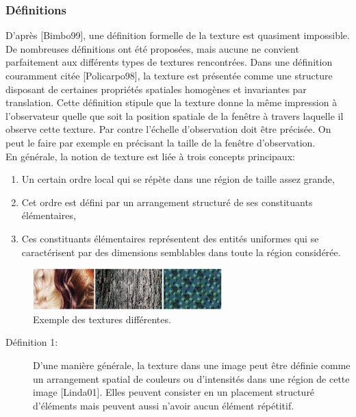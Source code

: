 \subsubsection{Définitions}

D'après [Bimbo99], une définition formelle de la texture est quasiment impossible. De nombreuses définitions ont été proposées, mais aucune ne convient parfaitement aux différents types de textures rencontrées. Dans une définition couramment citée [Policarpo98], la texture est présentée comme une structure disposant de certaines propriétés spatiales homogènes et invariantes par translation. Cette définition stipule que la texture donne la même impression à l'observateur quelle que soit la position spatiale de la fenêtre à travers laquelle il observe cette texture. Par contre l'échelle d’observation doit être précisée. On peut le faire par exemple en précisant la taille de la fenêtre d’observation.\\

En générale, la notion de texture est liée à trois concepts principaux:
\begin{enumerate}
	\item Un certain ordre local qui se répète dans une région de taille assez grande,
	
	\item Cet ordre est défini par un arrangement structuré de ses constituants élémentaires,
	
	\item Ces constituants élémentaires représentent des entités uniformes qui se caractérisent par des dimensions semblables dans toute la région considérée.\\ 
	
\end{enumerate}

\begin{figure}[H]
	\label{fig:textures}
	\centering
	\includegraphics[width=0.65\textwidth]{Figures/textures} %
	\caption{Exemple des textures différentes.}
\end{figure}

\begin{description}
	\item[Définition 1:] 	
	D'une manière générale, la texture dans une image peut être définie comme un arrangement spatial de couleurs ou d'intensités dans une région de cette image [Linda01]. Elles peuvent consister en un placement structuré d’éléments mais peuvent aussi n’avoir aucun élément répétitif.
\end{description}

